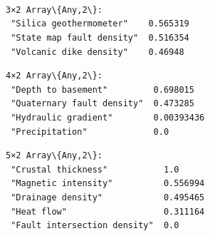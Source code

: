 \documentclass[11pt]{article}
\begin{document}
    \begin{Verbatim}[commandchars=\\\{\}]

    \end{Verbatim}

    \begin{center}
    \end{center}
    { \hspace*{\fill} \\}

    \begin{center}
    \end{center}
    { \hspace*{\fill} \\}

    \begin{Verbatim}[commandchars=\\\{\}]

    \end{Verbatim}

    \begin{center}
    \end{center}
    { \hspace*{\fill} \\}


    \begin{Verbatim}[commandchars=\\\{\}]
3×2 Array\{Any,2\}:
 "Silica geothermometer"    0.565319
 "State map fault density"  0.516354
 "Volcanic dike density"    0.46948
    \end{Verbatim}



    \begin{Verbatim}[commandchars=\\\{\}]
4×2 Array\{Any,2\}:
 "Depth to basement"         0.698015
 "Quaternary fault density"  0.473285
 "Hydraulic gradient"        0.00393436
 "Precipitation"             0.0
    \end{Verbatim}



    \begin{Verbatim}[commandchars=\\\{\}]
5×2 Array\{Any,2\}:
 "Crustal thickness"           1.0
 "Magnetic intensity"          0.556994
 "Drainage density"            0.495465
 "Heat flow"                   0.311164
 "Fault intersection density"  0.0
    \end{Verbatim}
\end{document}
